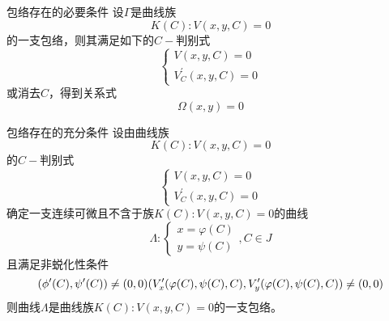 \documentclass[lang = cn, scheme = chinese, thmcnt = section]{elegantbook}
\begin{document}
\begin{theorem}{包络存在的必要条件}
	设$\Gamma$是曲线族
	$$
	K(C):V(x,y,C)=0
	$$
	的一支包络，则其满足如下的$C-$判别式
	$$
	\begin{cases}V(x,y,C)=0\\V_C^{\prime}(x,y,C)=0\end{cases}
	$$
	或消去$C$，得到关系式
	$$
	\Omega(x,y)=0
	$$
\end{theorem}

\begin{theorem}{包络存在的充分条件}
	设由曲线族
	$$
	K(C):V(x,y,C)=0
	$$
	的$C-$判别式
	$$
	\begin{cases}V(x,y,C)=0\\V_C^{\prime}(x,y,C)=0\end{cases}
	$$
	确定一支连续可微且不含于族$K(C):V(x,y,C)=0$的曲线
	$$
	\Lambda:\begin{cases}x=\varphi(C)\\y=\psi(C)\end{cases},C\in J
	$$
	且满足非蜕化性条件
	$$
	(\phi^{\prime}(C),\psi^{\prime}(C))\ne(0,0)\\(V_x^{\prime}(\varphi(C),\psi(C),C),V_y^{\prime}(\varphi(C),\psi(C),C))\ne(0,0)
	$$
	则曲线$\Lambda$是曲线族$K(C):V(x,y,C)=0$的一支包络。
\end{theorem}





























	
\end{document}

